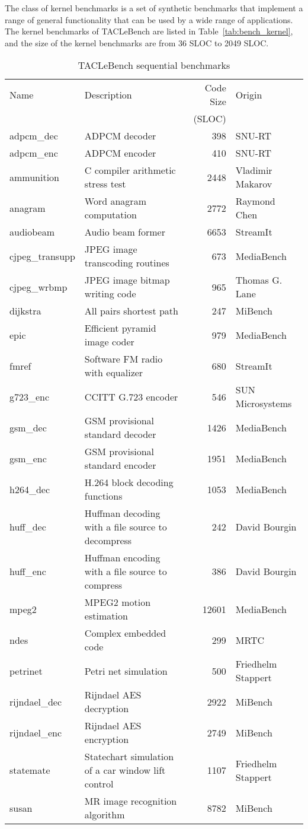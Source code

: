 \documentclass[a4paper,UKenglish]{oasics}
\begin{document}
The class of kernel benchmarks is a set of synthetic benchmarks that implement a range of general functionality that can be used by a wide range of applications.
The kernel benchmarks of TACLeBench are listed in Table~\ref{tab:bench_kernel}, and the size of the kernel benchmarks are from 36 SLOC to 2049 SLOC.

\begin{table}
\centering
\caption{\label{tab:bench_sequential}TACLeBench sequential benchmarks}
\begin{tabular}{lL{5.5cm}rR{2.5cm}}
\toprule
Name & Description & Code Size & Origin\\
   & &  (SLOC) & \\ \midrule
adpcm\_dec & ADPCM decoder & 398 & SNU-RT \\
adpcm\_enc &  ADPCM encoder  & 410  & SNU-RT \\
ammunition & C compiler arithmetic stress test  & 2448 & Vladimir Makarov \\
anagram &  Word anagram computation & 2772  & Raymond Chen \\
audiobeam &  Audio beam former  & 6653  & StreamIt \\
cjpeg\_transupp &  JPEG image transcoding routines  & 673 & MediaBench \\
cjpeg\_wrbmp & JPEG image bitmap writing code & 965 & Thomas G. Lane \\
dijkstra & All pairs shortest path  & 247  & MiBench \\
epic & Efficient pyramid image coder  & 979  & MediaBench \\
fmref &  Software FM radio with equalizer & 680  & StreamIt \\
g723\_enc &  CCITT G.723 encoder  & 546  & SUN Microsystems \\
gsm\_dec & GSM provisional standard decoder & 1426 & MediaBench \\
gsm\_enc & GSM provisional standard encoder & 1951 & MediaBench \\
h264\_dec &  H.264 block decoding functions & 1053 & MediaBench \\
huff\_dec &  Huffman decoding with a file source to decompress  & 242  & David Bourgin \\
huff\_enc & Huffman encoding with a file source to compress  & 386  & David Bourgin \\
mpeg2 &  MPEG2 motion estimation  & 12601 & MediaBench \\
ndes & Complex embedded code  & 299  & MRTC \\
petrinet & Petri net simulation & 500  & Friedhelm Stappert \\
rijndael\_dec & Rijndael AES decryption  & 2922 & MiBench \\
rijndael\_enc & Rijndael AES encryption  & 2749 & MiBench \\
statemate &  Statechart simulation of a car window lift control & 1107 & Friedhelm Stappert \\
susan &  MR image recognition algorithm & 8782 & MiBench \\
\bottomrule
\end{tabular}
\end{table}
\end{document}
